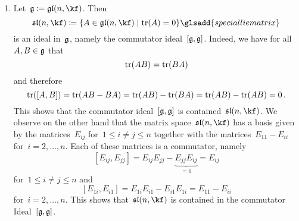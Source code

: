 \begin{examples}
  \leavevmode
  \begin{enumerate}
    \item
      Let~$\glie \defined \gllie(n, \kf)$.
      Then
      \[
        \sllie(n, \kf)
        \defined
        \{
          A \in \gllie(n, \kf)
        \suchthat
          \tr(A) = 0
        \}
        \glsadd{special lie matrix}
      \]
      is an ideal in~$\mathfrak{g}$, namely the commutator ideal~$[\mathfrak{g}, \mathfrak{g}]$.
      Indeed, we have for all~$A, B \in \mathfrak{g}$ that
      \[
        \operatorname{tr}(AB) = \operatorname{tr}(BA)
      \]
      and therefore
      \[
          \operatorname{tr}( [A,B] )
        = \operatorname{tr}(AB-BA)
        = \operatorname{tr}(AB) - \operatorname{tr}(BA)
        = \operatorname{tr}(AB) - \operatorname{tr}(AB)
        = 0  \,.
      \]
      This shows that the commutator ideal~$[\mathfrak{g}, \mathfrak{g}]$ is contained~$\sllie(n, \kf)$.
      We observe on the other hand that the matrix space~$\sllie(n, \kf)$ has a basis given by the matrices~$E_{ij}$ for~$1 \leq i \neq j \leq n$ together with the matrices~$E_{11} - E_{ii}$ for~$i = 2, \dotsc, n$.
      Each of these matrices is a commutator, namely
      \[
          [E_{ij}, E_{jj}]
          =
          E_{ij} E_{jj} - \underbrace{ E_{jj} E_{ij} }_{=0}
          =
          E_{ij}
      \]
      for~$1 \leq i \neq j \leq n$ and
      \[
        [E_{1i}, E_{i1}]
        =
        E_{1i} E_{i1} - E_{i1} E_{1i}
        =
        E_{11} - E_{ii}
      \]
      for~$i = 2, \dotsc, n$.
      This shows that~$\sllie(n, \kf)$ is contained in the commutator Ideal~$[\mathfrak{g}, \mathfrak{g}]$.
      

\end{enumerate}
\end{examples}
